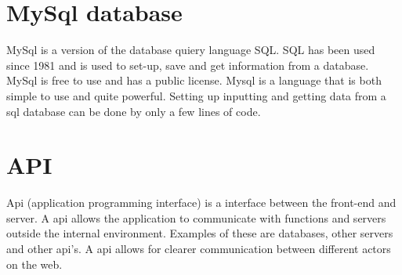 \section{MySql database}
MySql is a version of the database quiery language SQL. SQL has been used since 1981 and is used to set-up, save and get information from a database. MySql is free to use and has a public license. Mysql is a language that is both simple to use and quite powerful. Setting up inputting and getting data from a sql database can be done by only a few lines of code.

\section{API}
Api (application programming interface) is a interface between the front-end and server. A api allows the application to communicate with functions and servers outside the internal environment. Examples of these are databases, other servers and other api's. A api allows for clearer communication between different actors on the web. 

